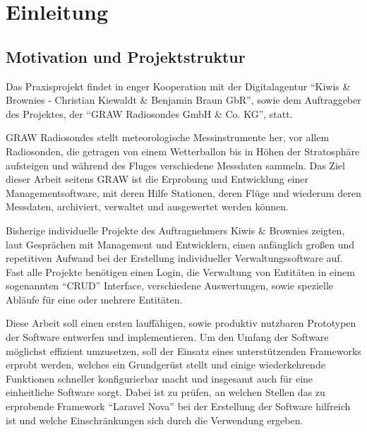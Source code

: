 \newpage


\section{Einleitung}

\subsection{Motivation und Projektstruktur}
Das Praxisprojekt findet in enger Kooperation mit der Digitalagentur \enquote{Kiwis \& Brownies - Christian Kiewaldt \& Benjamin Braun GbR}\cite{kiwis}, sowie dem Auftraggeber des Projektes, der \enquote{GRAW Radiosondes GmbH \& Co. KG}\cite{graw}, statt.

GRAW Radiosondes stellt meteorologische Messinstrumente her, vor allem Radiosonden, die getragen von einem Wetterballon bis in Höhen der Stratosphäre aufsteigen und während des Fluges verschiedene Messdaten sammeln.
Das Ziel dieser Arbeit seitens GRAW ist die Erprobung und Entwicklung einer Managementsoftware, mit deren Hilfe Stationen, deren Flüge und wiederum deren Messdaten, archiviert, verwaltet und ausgewertet werden können.

Bisherige individuelle Projekte des Auftragnehmers Kiwis \& Brownies zeigten, laut Gesprächen mit Management und Entwicklern, einen anfänglich großen und repetitiven Aufwand bei der Erstellung individueller Verwaltungssoftware auf.
Fast alle Projekte benötigen einen Login, die Verwaltung von Entitäten in einem sogenannten \enquote{CRUD}\cite{crud} Interface, verschiedene Auswertungen, sowie spezielle Abläufe für eine oder mehrere Entitäten.

Diese Arbeit soll einen ersten lauffähigen, sowie produktiv nutzbaren Prototypen der Software entwerfen und implementieren.
Um den Umfang der Software möglichst effizient umzusetzen, soll der Einsatz eines unterstützenden Frameworks erprobt werden, welches ein Grundgerüst stellt und einige wiederkehrende Funktionen schneller konfigurierbar macht und insgesamt auch für eine einheitliche Software sorgt.
Dabei ist zu prüfen, an welchen Stellen das zu erprobende Framework \enquote{Laravel Nova}\cite{laravel-nova} bei der Erstellung der Software hilfreich ist und welche Einschränkungen sich durch die Verwendung ergeben.

